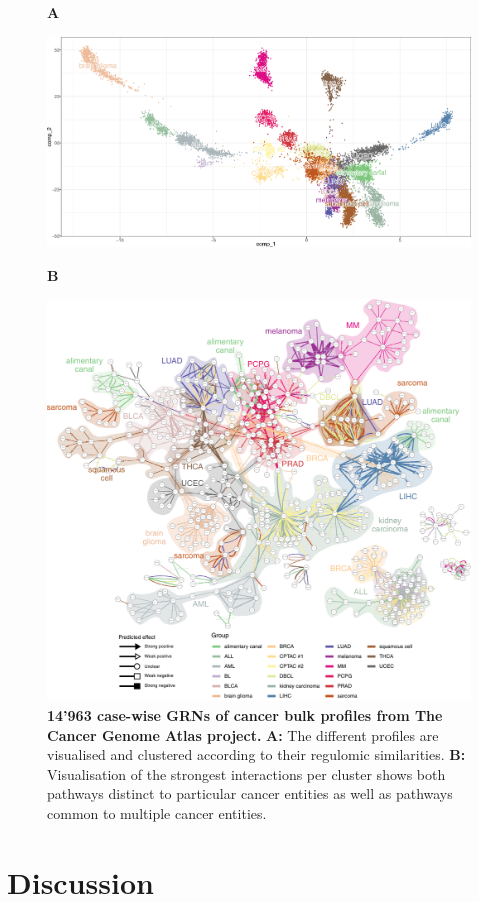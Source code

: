 \begin{figure}[htb!]
	{\raggedright\textbf{A}}
	\begin{center}\includegraphics[width=.8\linewidth]{fig/tcga/plot_fr_cropped.png}\end{center}
	{\raggedright\textbf{B}}
	\begin{center}\includegraphics[width=.85\linewidth]{fig/tcga/grouped_interactions_2.pdf}\end{center}
	\caption{
		\textbf{14'963 case-wise GRNs of cancer bulk profiles from The Cancer Genome Atlas project.}
		\textbf{A:} The different profiles are visualised and clustered according to their regulomic similarities.
		\textbf{B:} Visualisation of the strongest interactions per cluster shows both pathways distinct to particular cancer entities as well as pathways common to multiple cancer entities.
	}
	\label{fig:tcga}
\end{figure}


\section{Discussion}

